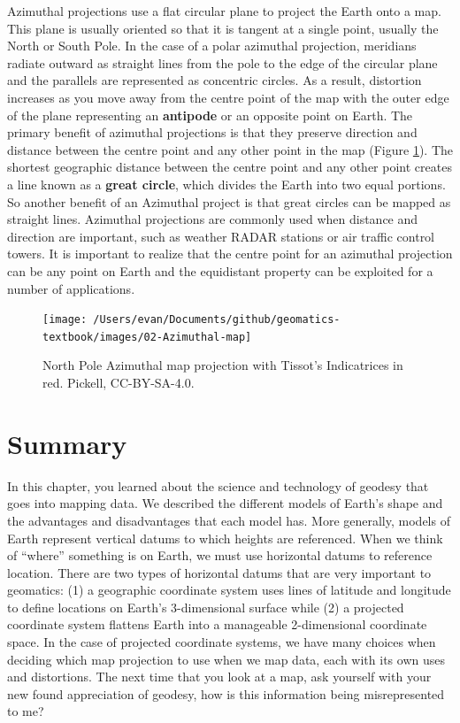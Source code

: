 \documentclass[
]{book}
\begin{document}
Azimuthal projections use a flat circular plane to project the Earth onto a map. This plane is usually oriented so that it is tangent at a single point, usually the North or South Pole. In the case of a polar azimuthal projection, meridians radiate outward as straight lines from the pole to the edge of the circular plane and the parallels are represented as concentric circles. As a result, distortion increases as you move away from the centre point of the map with the outer edge of the plane representing an \textbf{antipode} or an opposite point on Earth. The primary benefit of azimuthal projections is that they preserve direction and distance between the centre point and any other point in the map (Figure \ref{fig:2-Azimuthal-map}). The shortest geographic distance between the centre point and any other point creates a line known as a \textbf{great circle}, which divides the Earth into two equal portions. So another benefit of an Azimuthal project is that great circles can be mapped as straight lines. Azimuthal projections are commonly used when distance and direction are important, such as weather RADAR stations or air traffic control towers. It is important to realize that the centre point for an azimuthal projection can be any point on Earth and the equidistant property can be exploited for a number of applications.

\begin{figure}
\texttt{[image: /Users/evan/Documents/github/geomatics-textbook/images/02-Azimuthal-map]} \caption{North Pole Azimuthal map projection with Tissot's Indicatrices in red. Pickell, CC-BY-SA-4.0.}\label{fig:2-Azimuthal-map}
\end{figure}

\hypertarget{summary-1}{%
\section{Summary}\label{summary-1}}

In this chapter, you learned about the science and technology of geodesy that goes into mapping data. We described the different models of Earth's shape and the advantages and disadvantages that each model has. More generally, models of Earth represent vertical datums to which heights are referenced. When we think of ``where'' something is on Earth, we must use horizontal datums to reference location. There are two types of horizontal datums that are very important to geomatics: (1) a geographic coordinate system uses lines of latitude and longitude to define locations on Earth's 3-dimensional surface while (2) a projected coordinate system flattens Earth into a manageable 2-dimensional coordinate space. In the case of projected coordinate systems, we have many choices when deciding which map projection to use when we map data, each with its own uses and distortions. The next time that you look at a map, ask yourself with your new found appreciation of geodesy, how is this information being misrepresented to me?
\end{document}
